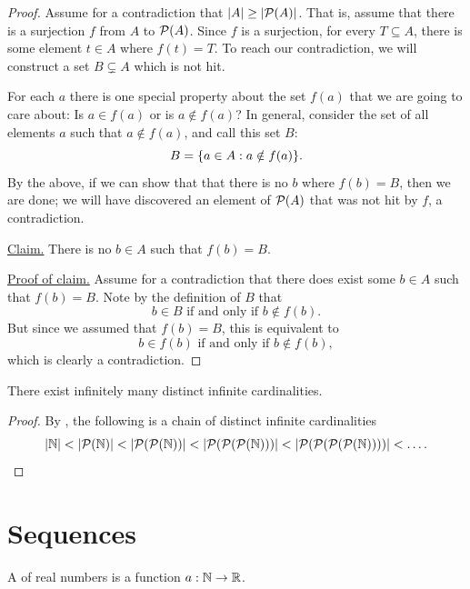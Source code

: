 \documentclass[11pt,twoside=off,numbers=noenddot]{scrbook}
\begin{document}
\begin{proof}
  Assume for a contradiction that $| A | \geq | \mathcal{P}(A) |$.
  That is, assume that there is a surjection $f$ from $A$ to
  $\mathcal{P}(A)$. Since $f$ is a surjection, for every $T \subseteq A$,
  there is some element $t \in A$ where $f(t) = T$. To reach our
  contradiction, we will construct a set $B \subsetneq A$ which is not hit.

  For each $a$ there is one special property about the set $f(a)$
  that we are going to care about: Is $a \in f(a)$ or is $a \notin
  f(a)$? In general, consider the set of all elements $a$ such that
  $a \notin f(a)$, and call this set $B$:
  \[ B = \{ a \in A : a \notin f(a) \}. \]
  By the above, if we can show that that there is no $b$ where $f(b)
  = B$, then we are done; we will have discovered an element of
  $\mathcal{P}(A)$ that was not hit by $f$, a contradiction.

  \underline{Claim.} There is no $b \in A$ such that $f(b) = B$.

  \underline{Proof of claim.} Assume for a contradiction that there
  does exist some $b \in A$ such that $f(b) = B$. Note by the
  definition of $B$ that
  \[ \text{$b \in B$ if and only if $b \notin f(b)$}. \]
  But since we assumed that $f(b) = B$, this is equivalent to
  \[ \text{$b \in f(b)$ if and only if $b \notin f(b)$}, \]
  which is clearly a contradiction.
\end{proof}

\begin{corollary}
  There exist infinitely many distinct infinite cardinalities.
\end{corollary}

\begin{proof}
  By , the following is a chain
  of distinct infinite cardinalities
  \[ | \mathbb N | < | \mathcal{P}(\mathbb N) | < | \mathcal{P}(\mathcal{P}(\mathbb N)) | <
    | \mathcal{P}(\mathcal{P}(\mathcal{P}(\mathbb N))) | <
  | \mathcal{P}(\mathcal{P}(\mathcal{P}(\mathcal{P}(\mathbb N)))) | < \dots.\]
\end{proof}

\chapter{Sequences}
\begin{definition}
  A  of real numbers is a function $a : \mathbb N \to \mathbb R$.
\end{definition}
\end{document}
